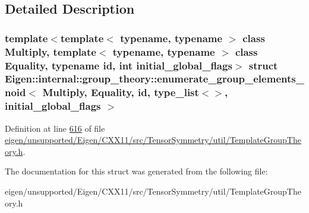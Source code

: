 \subsection{Detailed Description}
\subsubsection*{template$<$template$<$ typename, typename $>$ class Multiply, template$<$ typename, typename $>$ class Equality, typename id, int initial\+\_\+global\+\_\+flags$>$\newline
struct Eigen\+::internal\+::group\+\_\+theory\+::enumerate\+\_\+group\+\_\+elements\+\_\+noid$<$ Multiply, Equality, id, type\+\_\+list$<$$>$, initial\+\_\+global\+\_\+flags $>$}



Definition at line \hyperlink{eigen_2unsupported_2_eigen_2_c_x_x11_2src_2_tensor_symmetry_2util_2_template_group_theory_8h_source_l00616}{616} of file \hyperlink{eigen_2unsupported_2_eigen_2_c_x_x11_2src_2_tensor_symmetry_2util_2_template_group_theory_8h_source}{eigen/unsupported/\+Eigen/\+C\+X\+X11/src/\+Tensor\+Symmetry/util/\+Template\+Group\+Theory.\+h}.



The documentation for this struct was generated from the following file\+:\begin{DoxyCompactItemize}
\item 
eigen/unsupported/\+Eigen/\+C\+X\+X11/src/\+Tensor\+Symmetry/util/\+Template\+Group\+Theory.\+h\end{DoxyCompactItemize}
